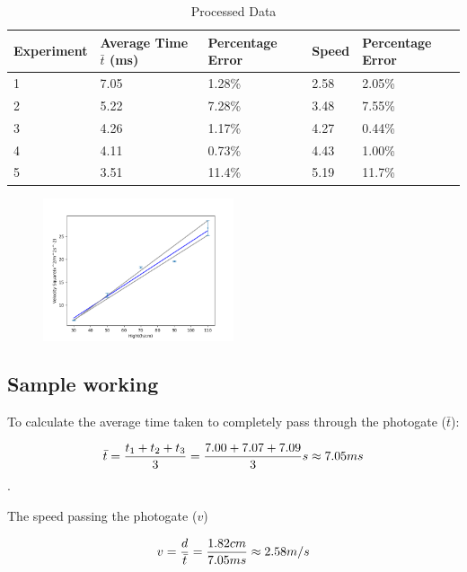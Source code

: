 \documentclass[a4paper]{article}
\begin{document}
    \begin{table}[ht!]\centering
        \caption{Processed Data}
        \begin{tabular}{|l|l|l|l|l|}
        \hline
        Experiment & Average Time $\bar{t}$ (ms) & Percentage Error & Speed & Percentage Error \\ \hline
        1          & 7.05                        & 1.28\%            & 2.58  & 2.05\%            \\ \hline
        2          & 5.22                        & 7.28\%            & 3.48  & 7.55\%            \\ \hline
        3          & 4.26                        & 1.17\%            & 4.27  & 0.44\%            \\ \hline
        4          & 4.11                        & 0.73\%            & 4.43  & 1.00\%            \\ \hline
        5          & 3.51                        & 11.4\%            & 5.19  & 11.7\%            \\ \hline
        \end{tabular}
    \end{table}
    \begin{figure}[h!]
        \centering
        \includegraphics[width = 0.5\textwidth]{Figure_1.png}
    \end{figure}

    \subsection{Sample working}
        To calculate the average time taken to completely pass through the photogate ($\bar{t}$):

        $$\bar{t} = {{t_1+t_2+t_3}\over 3} = {{7.00+7.07+7.09} \over 3} s \approx 7.05 ms$$.

        The speed passing the photogate ($v$)

        $$v = {d \over \bar{t}} = {1.82cm \over 7.05ms} \approx 2.58 m/s$$
\end{document}
